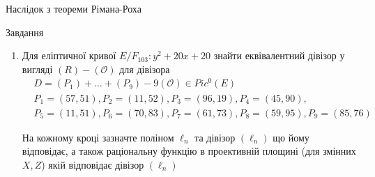 \documentclass[9pt]{beamer}
\begin{document}
\begin{darkframes}
\begin{frame}{Наслідок з теореми Рімана-Роха}
\begin{enumerate}
\end{enumerate}

\end{frame}

\begin{frame}{Завдання}
    \begin{enumerate}
        \item Для еліптичної кривої $E/F_{103}: y^2 +20x+20$ знайти еквівалентний дівізор у вигляді $(R)-(\mathcal{O})$ для дівізора 
        \begin{align*}
            & D=(P_1) + \dots + (P_{9})-9(\mathcal{O}) \in Pic^0(E) \\
            &P_1 = (57, 51), P_2 = (11, 52), P_3 = (96, 19), P_4 = (45, 90),\\ 
            &P_5 = (11, 51), P_6 = (70, 83), P_7 = (61, 73), P_8 = (59, 95), P_9=(85, 76)
        \end{align*}
        

        На кожному кроці зазначте поліном $\ell_n$ та дівізор $(\ell_n)$ що йому відповідає, а також раціональну функцію в проективній площині (для змінних $X,Z$) якій відповідає дівізор $(\ell_n)$
    \end{enumerate}
\end{frame}
  \end{darkframes}
\end{document}
